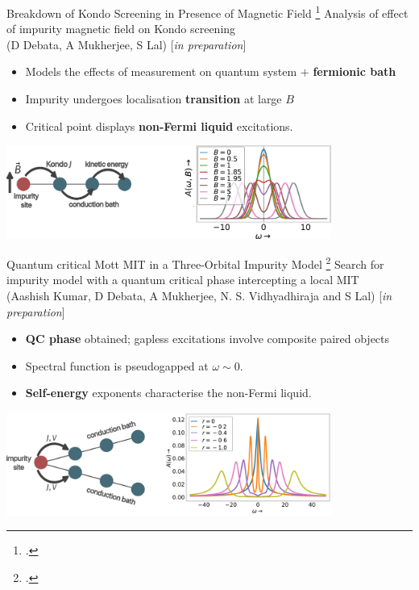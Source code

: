 \documentclass[11pt,aspectratio=169]{beamer}
\newcommand\focus[1]{%
	{\alert{\textbf{#1}}}
}
\begin{document}
\begin{frame}{Breakdown of Kondo Screening in Presence of Magnetic Field}
\footcite{costi2000,Zhang2013}
\flushleft
Analysis of effect of impurity magnetic field on Kondo screening \\
(D Debata, A Mukherjee, S Lal) [{\it in preparation}]\\[10pt]

\begin{itemize}
	\item Models the effects of measurement on quantum system $+$ \focus{fermionic bath}
	\item Impurity undergoes localisation \focus{transition} at large \(B\)
	\item Critical point displays \focus{non-Fermi liquid} excitations.
\end{itemize}

\vspace*{\fill}
\centering
\includegraphics[width=0.8\textwidth]{kondoBFieldSpecFunc.pdf}

\end{frame}

\begin{frame}{Quantum critical Mott MIT in a Three-Orbital Impurity Model}
	\footcite{sujan2023,sudeshna2016}
\flushleft
Search for impurity model with a quantum critical phase intercepting a local MIT\\
(Aashish Kumar, D Debata, A Mukherjee, N. S. Vidhyadhiraja and S Lal) [{\it in preparation}]

\vspace*{\fill}
\begin{itemize}
	\item \focus{QC phase} obtained; gapless excitations involve composite paired objects
	\item Spectral function is pseudogapped at \(\omega \sim 0\).
	\item \focus{Self-energy} exponents characterise the non-Fermi liquid.
\end{itemize}

\vspace*{\fill}
\centering
\includegraphics[width=0.8\textwidth]{threeOrbitalSpecFunc.pdf}
\end{frame}
\end{document}
